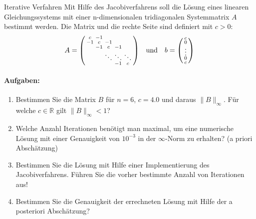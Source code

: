 \begin{example2}{Iterative Verfahren}
Mit Hilfe des Jacobiverfahrens soll die Lösung eines linearen Gleichungssystems mit einer n-dimensionalen tridiagonalen Systemmatrix $A$ bestimmt werden. Die Matrix und die rechte Seite sind definiert mit $c > 0$:
$$A = \begin{psmallmatrix}
c & -1 & & & \\
-1 & c & -1 & & \\
& -1 & c & -1 & \\
& & \ddots & \ddots & \ddots \\
& & & -1 & c
\end{psmallmatrix}
\quad \text{und} \quad
b = \begin{psmallmatrix}
c\\
0\\
\vdots\\
0\\
c
\end{psmallmatrix}$$

\paragraph{Aufgaben:}
\begin{enumerate}
    \item Bestimmen Sie die Matrix $B$ für $n=6$, $c=4.0$ und daraus $\|B\|_\infty$. Für welche $c \in \mathbb{R}$ gilt $\|B\|_\infty < 1$?
    
    \item Welche Anzahl Iterationen benötigt man maximal, um eine numerische Lösung mit einer Genauigkeit von $10^{-3}$ in der $\infty$-Norm zu erhalten? (a priori Abschätzung)
    
    \item Bestimmen Sie die Lösung mit Hilfe einer Implementierung des Jacobiverfahrens. Führen Sie die vorher bestimmte Anzahl von Iterationen aus!
    
    \item Bestimmen Sie die Genauigkeit der errechneten Lösung mit Hilfe der a posteriori Abschätzung?
\end{enumerate}
\end{example2}


